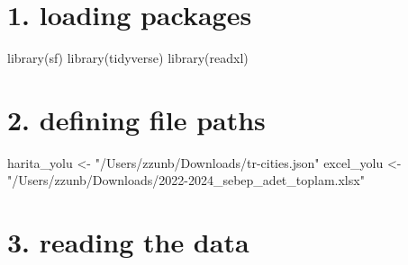 \documentclass[
  11pt,
  a4paper,
  DIV=11,
  numbers=noendperiod]{scrartcl}
\newenvironment{Shaded}{\begin{snugshade}}{\end{snugshade}}
\newcommand{\FunctionTok}[1]{\textcolor[rgb]{0.28,0.35,0.67}{#1}}
\newcommand{\NormalTok}[1]{\textcolor[rgb]{0.00,0.23,0.31}{#1}}
\newcommand{\OtherTok}[1]{\textcolor[rgb]{0.00,0.23,0.31}{#1}}
\newcommand{\StringTok}[1]{\textcolor[rgb]{0.13,0.47,0.30}{#1}}
\begin{document}
\section{1. loading packages}\label{loading-packages}

\begin{Shaded}
\begin{Highlighting}[]
\FunctionTok{library}\NormalTok{(sf)}
\FunctionTok{library}\NormalTok{(tidyverse)}
\FunctionTok{library}\NormalTok{(readxl)}
\end{Highlighting}
\end{Shaded}

\section{2. defining file paths}\label{defining-file-paths}

\begin{Shaded}
\begin{Highlighting}[]
\NormalTok{harita\_yolu }\OtherTok{\textless{}{-}} \StringTok{"/Users/zzunb/Downloads/tr{-}cities.json"}
\NormalTok{excel\_yolu }\OtherTok{\textless{}{-}} \StringTok{"/Users/zzunb/Downloads/2022{-}2024\_sebep\_adet\_toplam.xlsx"}
\end{Highlighting}
\end{Shaded}

\section{3. reading the data}\label{reading-the-data}
\end{document}

